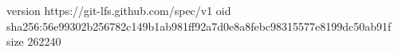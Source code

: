 version https://git-lfs.github.com/spec/v1
oid sha256:56e99302b256782c149b1ab981ff92a7d0e8a8febc98315577e8199dc50ab91f
size 262240
